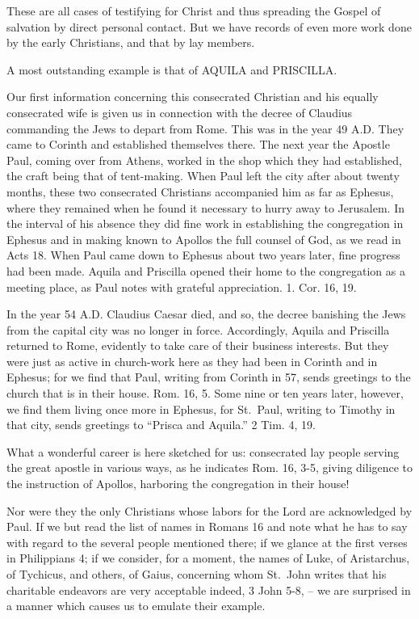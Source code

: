 \documentclass[
]{book}
\begin{document}
These are all cases of testifying for Christ and thus spreading the Gospel of salvation by direct personal contact. But we have records of even more work done by the early Christians, and that by lay members.

A most outstanding example is that of AQUILA and PRISCILLA.

Our first information concerning this consecrated Christian and his equally consecrated wife is given us in connection with the decree of Claudius commanding the Jews to depart from Rome. This was in the year 49 A.D. They came to Corinth and established themselves there. The next year the Apostle Paul, coming over from Athens, worked in the shop which they had established, the craft being that of tent-making. When Paul left the city after about twenty months, these two consecrated Christians accompanied him as far as Ephesus, where they remained when he found it necessary to hurry away to Jerusalem. In the interval of his absence they did fine work in establishing the congregation in Ephesus and in making known to Apollos the full counsel of God, as we read in Acts 18. When Paul came down to Ephesus about two years later, fine progress had been made. Aquila and Priscilla opened their home to the congregation as a meeting place, as Paul notes with grateful appreciation. 1. Cor. 16, 19.

In the year 54 A.D. Claudius Caesar died, and so, the decree banishing the Jews from the capital city was no longer in force. Accordingly, Aquila and Priscilla returned to Rome, evidently to take care of their business interests. But they were just as active in church-work here as they had been in Corinth and in Ephesus; for we find that Paul, writing from Corinth in 57, sends greetings to the church that is in their house. Rom. 16, 5. Some nine or ten years later, however, we find them living once more in Ephesus, for St.~Paul, writing to Timothy in that city, sends greetings to ``Prisca and Aquila.'' 2 Tim. 4, 19.

What a wonderful career is here sketched for us: consecrated lay people serving the great apostle in various ways, as he indicates Rom. 16, 3-5, giving diligence to the instruction of Apollos, harboring the congregation in their house!

Nor were they the only Christians whose labors for the Lord are acknowledged by Paul. If we but read the list of names in Romans 16 and note what he has to say with regard to the several people mentioned there; if we glance at the first verses in Philippians 4; if we consider, for a moment, the names of Luke, of Aristarchus, of Tychicus, and others, of Gaius, concerning whom St.~John writes that his charitable endeavors are very acceptable indeed, 3 John 5-8, -- we are surprised in a manner which causes us to emulate their example.
\end{document}
